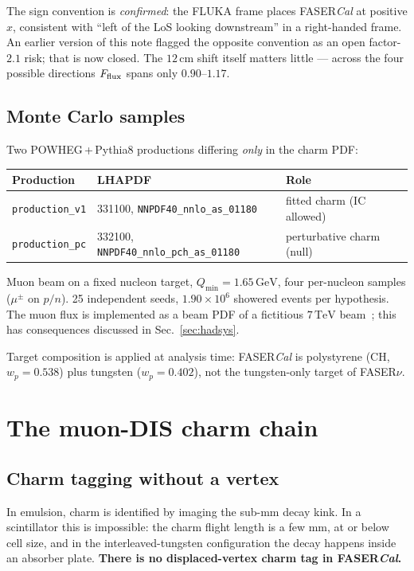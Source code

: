 \documentclass[11pt,a4paper]{article}
\newcommand{\GeV}{\,\mathrm{GeV}}
\begin{document}
The sign convention is \emph{confirmed}: the FLUKA frame places FASER\emph{Cal}
at positive $x$, consistent with ``left of the LoS looking downstream'' in a
right-handed frame. An earlier version of this note flagged the opposite
convention as an open factor-$2.1$ risk; that is now closed. The $12\,$cm shift
itself matters little --- across the four possible directions $F_{\rm flux}$
spans only $0.90$--$1.17$.

\subsection{Monte Carlo samples}
Two POWHEG\,+\,Pythia8 productions differing \emph{only} in the charm PDF:
\begin{center}\small
\begin{tabular}{lll}
\toprule
Production & LHAPDF & Role \\
\midrule
\texttt{production\_v1} & 331100, \texttt{NNPDF40\_nnlo\_as\_01180} & fitted charm (IC allowed) \\
\texttt{production\_pc} & 332100, \texttt{NNPDF40\_nnlo\_pch\_as\_01180} & perturbative charm (null) \\
\bottomrule
\end{tabular}
\end{center}
Muon beam on a fixed nucleon target, $Q_{\min}=1.65\GeV$, four per-nucleon
samples ($\mu^\pm$ on $p/n$). 25 independent seeds, $1.90\times10^{6}$ showered
events per hypothesis. The muon flux is implemented as a beam PDF of a
fictitious $7\,\mathrm{TeV}$ beam~\cite{francener}; this has consequences discussed in
Sec.~\ref{sec:hadsys}.

Target composition is applied at analysis time: FASER\emph{Cal} is polystyrene
(CH, $w_p=0.538$) plus tungsten ($w_p=0.402$), not the tungsten-only target of
FASER$\nu$.

\section{The muon-DIS charm chain}
\label{sec:chain}

\subsection{Charm tagging without a vertex}
In emulsion, charm is identified by imaging the sub-mm decay kink. In a
scintillator this is impossible: the charm flight length is a few mm, at or
below cell size, and in the interleaved-tungsten configuration the decay happens
inside an absorber plate. \textbf{There is no displaced-vertex charm tag in
FASER\emph{Cal}.}
\end{document}
